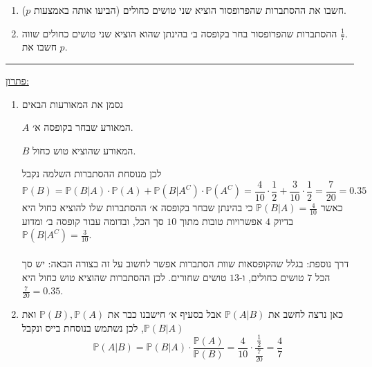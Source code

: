 \documentclass[12pt, a4paper]{article}
\newcommand{\PP}{\mathbb{P}}
\begin{document}
\begin{enumerate}
\begin{enumerate}
\begin{enumerate}
\item[(1)]
חשבו את ההסתברות  שהפרופסור הוציא שני טושים כחולים (הביעו אותה באמצעות
$p$).
\item[(2)]
ההסתברות שהפרופסור בחר בקופסה ב׳ בהינתן שהוא הוציא שני טושים כחולים שווה
$\frac{1}{7}$.
\\
חשבו את
$p$.
\end{enumerate}

\end{enumerate}

\noindent\rule{15cm}{0.4pt}

\underline{פתרון:}

\begin{enumerate}
\item
נסמן את המאורעות הבאים

$A$
המאורע שבחר בקופסה א׳.

$B$
 המאורע שהוציא טוש כחול.
 
 לכן מנוסחת ההסתברות השלמה נקבל
 $$\boxed{\PP(B)}=
 \PP(B|A)\cdot \PP(A)+
 \PP(B|A^C)\cdot \PP(A^C)
 =\frac{4}{10}\cdot
 \frac{1}{2}+
 \frac{3}{10}\cdot\frac{1}{2}=\frac{7}{20}=\boxed{0.35}$$
 כאשר
 $\PP(B|A)=\frac{4}{10}$
 כי בהינתן שבחר בקופסה א׳ ההסתברות שלו להוציא כחול היא בדיוק
 $4$
 אפשרויות טובות מתוך 
 $10$
 סך הכל, ובדומה עבור קופסה ב׳ ומדוע
 $\PP(B|A^C)=\frac{3}{10}$.
 \\\\
 דרך נוספת:
בגלל שהקופסאות שוות הסתברות אפשר לחשוב על זה בצורה הבאה:
יש סך הכל
$7$
טושים כחולים,
ו-$13$
טושים שחורים. לכן ההסתברות שהוציא טוש כחול היא
$\frac{7}{20}=0.35$.
\item
כאן נרצה לחשב את
$\PP(A|B)$
אבל בסעיף א׳ חישבנו כבר את
$\PP(B),\PP(A)$
ואת
$\PP(B|A)$,
לכן נשתמש בנוסחת בייס ונקבל
$$\boxed{\PP(A|B)}=\PP(B|A)\cdot
\frac{\PP(A)}{\PP(B)}=\frac{4}{10}\cdot
\frac{\frac{1}{2}}{\frac{7}{20}}=\boxed{\frac{4}{7}}$$


\end{enumerate}
\end{enumerate}
\end{document}
